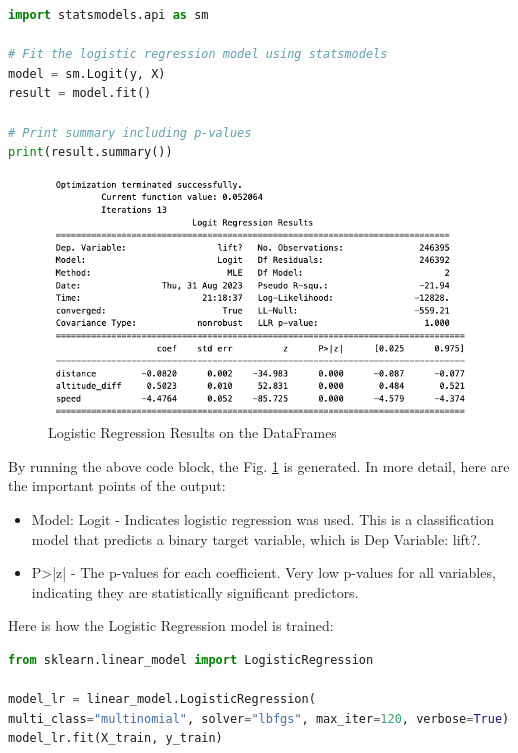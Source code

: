 \begin{lstlisting}[language=Python]
import statsmodels.api as sm

# Fit the logistic regression model using statsmodels
model = sm.Logit(y, X)
result = model.fit()

# Print summary including p-values
print(result.summary())
\end{lstlisting}
\begin{figure}[ht]
	\includegraphics[width=\textwidth]{resources/pvalue.png}
	\caption{Logistic Regression Results on the DataFrames}
	\label{fig:pvalue}
\end{figure}



By running the above code block, the Fig. \ref{fig:pvalue} is generated. In more detail, here are the important points of the output:

\begin{itemize}
	\item Model: Logit - Indicates logistic regression was used. This is a classification model that predicts a binary target variable, which is Dep Variable: lift?.
	
	\item P>|z| - The p-values for each coefficient. Very low p-values for all variables, indicating they are statistically significant predictors.	
\end{itemize}

Here is how the Logistic Regression model is trained:
\begin{lstlisting}[language=Python]
from sklearn.linear_model import LogisticRegression

model_lr = linear_model.LogisticRegression(
multi_class="multinomial", solver="lbfgs", max_iter=120, verbose=True)
model_lr.fit(X_train, y_train)
\end{lstlisting}


